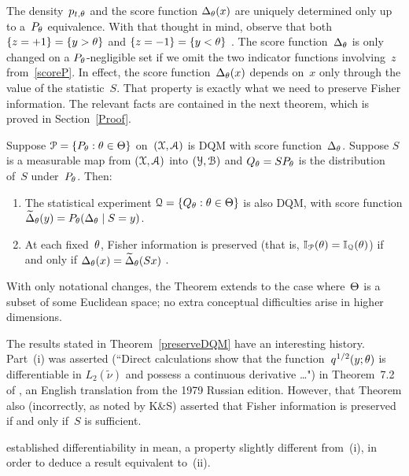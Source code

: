 \documentclass[aos]{imsart}
\begin{document}
The density~$p_{t,\theta}$ and the score function $\Delta_\theta(x)$ are
uniquely determined only up to a~$P_\theta$ equivalence. With that
thought in mind, observe that both $\{z=+1\} =\{y>\theta\}$  and
$\{z=-1\} =\{y<\theta\}$ . The score function~$\Delta_\theta$ is
only changed on a $P_\theta$-negligible set if we omit the two indicator
functions involving~$z$ from~\cref{scoreP}. In effect, the score
function~$\Delta_\theta(x)$ depends on~$x$ only through the value of the
statistic~$S$. That property is exactly what we need to preserve Fisher information. The relevant facts are contained in the next theorem, which is proved in Section~\ref{Proof}.

\Theorem  \label{preserveDQM}
Suppose ${\EuScript P}=\{P_\theta:\theta\in\Theta\}$ on~$({\EuScript X},{\EuScript A})$
is DQM  with score function~$\Delta_\theta$.
Suppose $S$ is a measurable map from $({\EuScript X},{\EuScript A})$ into $({\EuScript Y},{\EuScript B})$
and $Q_\theta = SP_\theta$ is the distribution of~$S$ under~$P_\theta$.
Then: 
\begin{enumerate} 
\item
The statistical experiment
${\EuScript Q}=\{Q_\theta:\theta\in\Theta\}$ is also DQM, with score function 
$\widetilde\Delta_\theta(y) = P_\theta(\Delta_\theta\mid S=y)$.  

\item
At each fixed~$\theta$, Fisher information is preserved (that is, ${\mathbb I}_{\EuScript P}(\theta)={\mathbb I}_{\EuScript Q}(\theta)$) if and only if $\Delta_\theta(x) = \widetilde\Delta_\theta(Sx)$ .

\end{enumerate} 
\endTheorem


With only notational changes, the  Theorem extends to the case
where~$\Theta$ is a subset of some Euclidean space; no extra conceptual
difficulties arise in higher dimensions.

The results stated in Theorem~\ref{preserveDQM} have an interesting history. Part~(i) was asserted (``Direct calculations show that the function~$q^{1/2}(y;\theta)$ is differentiable in $L_2(\widetilde\nu)$ and possess a continuous derivative \dots") in Theorem~7.2 of 
\citet[Chapter~I, page~70]{Ibragimov:Hasminskii:81book}, an English translation from the 1979 Russian edition. However, that Theorem also (incorrectly, as noted by K\&S) asserted that Fisher information is preserved if and only if~$S$ is sufficient.

\citet[pages~19--21]{Pitman1979book} established differentiability in mean, a property slightly different from~(i), in order to deduce a result equivalent to~(ii).
\end{document}
